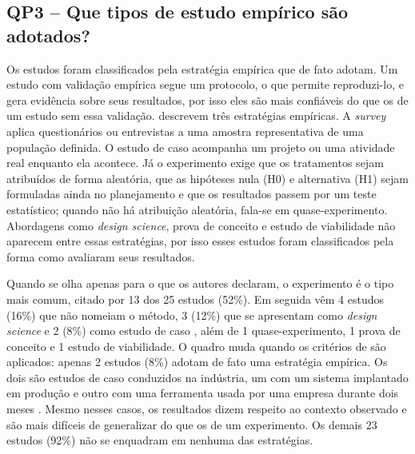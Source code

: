\subsection{QP3 -- Que tipos de estudo empírico são adotados?}
\label{sec:qp3}

Os estudos foram classificados pela estratégia empírica que de fato adotam. Um estudo com validação empírica segue um protocolo, o que permite reproduzi-lo, e gera evidência sobre seus resultados, por isso eles são mais confiáveis do que os de um estudo sem essa validação.  descrevem três estratégias empíricas. A \textit{survey} aplica questionários ou entrevistas a uma amostra representativa de uma população definida. O estudo de caso acompanha um projeto ou uma atividade real enquanto ela acontece. Já o experimento exige que os tratamentos sejam atribuídos de forma aleatória, que as hipóteses nula (H0) e alternativa (H1) sejam formuladas ainda no planejamento e que os resultados passem por um teste estatístico; quando não há atribuição aleatória, fala-se em quase-experimento. Abordagens como \textit{design science}, prova de conceito e estudo de viabilidade não aparecem entre essas estratégias, por isso esses estudos foram classificados pela forma como avaliaram seus resultados.

Quando se olha apenas para o que os autores declaram, o experimento é o tipo mais comum, citado por 13 dos 25 estudos (52\%). Em seguida vêm 4 estudos (16\%) que não nomeiam o método, 3 (12\%) que se apresentam como \textit{design science} e 2 (8\%) como estudo de caso \cite{wang2025,ferreira2025}, além de 1 quase-experimento, 1 prova de conceito e 1 estudo de viabilidade. O quadro muda quando os critérios de  são aplicados: apenas 2 estudos (8\%) adotam de fato uma estratégia empírica. Os dois são estudos de caso conduzidos na indústria, um com um sistema implantado em produção \cite{baker2026} e outro com uma ferramenta usada por uma empresa durante dois meses \cite{ferreira2025}. Mesmo nesses casos, os resultados dizem respeito ao contexto observado e são mais difíceis de generalizar do que os de um experimento. Os demais 23 estudos (92\%) não se enquadram em nenhuma das estratégias.

